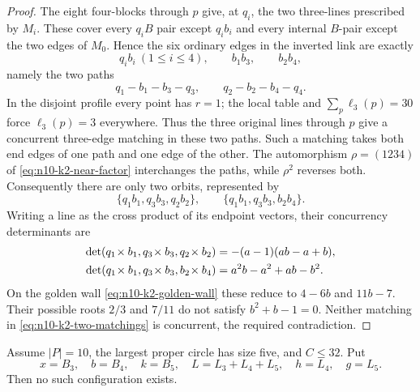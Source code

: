 \begin{proof}
The eight four-blocks through $p$ give, at $q_i$, the two three-lines
prescribed by $M_i$.  These cover every $q_iB$ pair except $q_ib_i$ and
every internal $B$-pair except the two edges of $M_0$.  Hence the six
ordinary edges in the inverted link are exactly
\begin{equation}\label{eq:n10-k2-two-paths}
 q_ib_i\ (1\le i\le4),\qquad b_1b_3,\qquad b_2b_4,
\end{equation}
namely the two paths
\[
 q_1-b_1-b_3-q_3,\qquad q_2-b_2-b_4-q_4.
\]
In the disjoint profile every point has $r=1$; the local table and
$\sum_p\ell_3(p)=30$ force $\ell_3(p)=3$ everywhere.  Thus the three
original lines through $p$ give a concurrent three-edge matching in these
two paths.  Such a matching takes both end edges of one path and one edge
of the other.  The automorphism $\rho=(1234)$ of
\eqref{eq:n10-k2-near-factor} interchanges the paths, while $\rho^2$
reverses both.  Consequently there are only two orbits, represented by
\begin{equation}\label{eq:n10-k2-two-matchings}
 \{q_1b_1,q_3b_3,q_2b_2\},\qquad
 \{q_1b_1,q_3b_3,b_2b_4\}.
\end{equation}
Writing a line as the cross product of its endpoint vectors, their
concurrency determinants are
\begin{align}
 \det(q_1\!\times b_1,q_3\!\times b_3,q_2\!\times b_2)
   &=-(a-1)(ab-a+b),\notag\\
 \det(q_1\!\times b_1,q_3\!\times b_3,b_2\!\times b_4)
   &=a^2b-a^2+ab-b^2.\label{eq:n10-k2-determinants}
\end{align}
On the golden wall \eqref{eq:n10-k2-golden-wall} these reduce to
$4-6b$ and $11b-7$.  Their possible roots $2/3$ and $7/11$ do not satisfy
$b^2+b-1=0$.  Neither matching in \eqref{eq:n10-k2-two-matchings} is
concurrent, the required contradiction.
\end{proof}

\begin{lemma}\label{lem:n10-five-block-kernel}
Assume $|P|=10$, the largest proper circle has size five, and $C\le32$.
Put
\[
x=B_3,\quad b=B_4,\quad k=B_5,\quad
L=L_3+L_4+L_5,\quad h=L_4,\quad g=L_5.
\]
Then no such configuration exists.
\end{lemma}

